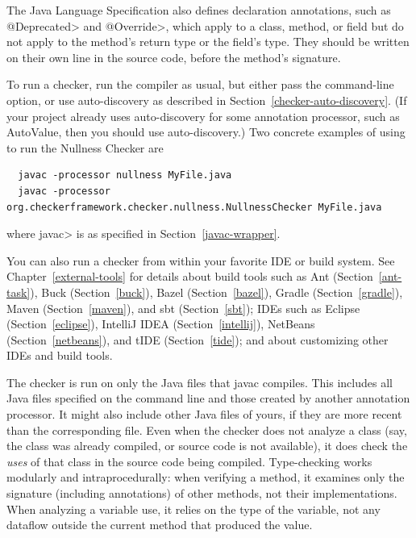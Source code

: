The Java Language Specification also defines
declaration annotations, such as \<@Deprecated> and \<@Override>, which apply
to a class, method, or field but do not apply to the method's return type
or the field's type.  They should be written on their own line in the
source code, before the method's signature.



To run a checker, run the compiler  as usual,
but either pass the  command-line
option, or use auto-discovery as described in
Section~\ref{checker-auto-discovery}.
(If your project already uses auto-discovery for some annotation processor,
such as AutoValue, then you should use auto-discovery.)
Two concrete examples of using  to run the Nullness Checker are

\begin{Verbatim}
  javac -processor nullness MyFile.java
  javac -processor org.checkerframework.checker.nullness.NullnessChecker MyFile.java
\end{Verbatim}

\noindent
where \<javac> is as specified in Section~\ref{javac-wrapper}.

You can also run a checker from within your favorite IDE or build system.  See
Chapter~\ref{external-tools} for details about build tools such as
Ant (Section~\ref{ant-task}),
Buck (Section~\ref{buck}),
Bazel (Section~\ref{bazel}),
Gradle (Section~\ref{gradle}),
Maven (Section~\ref{maven}), and
sbt (Section~\ref{sbt});
IDEs such as
Eclipse (Section~\ref{eclipse}),
IntelliJ IDEA (Section~\ref{intellij}),
NetBeans (Section~\ref{netbeans}),
and
tIDE (Section~\ref{tide});
and about customizing other IDEs and build tools.

The checker is run on only the Java files that javac compiles.
This includes all Java files specified on the command line and those
created by another annotation processor.  It might also include other Java
files of yours, if they are more recent than the corresponding  file.
Even when the checker does not analyze a class (say, the class was
already compiled, or source code is not available), it does check
the \emph{uses} of that class in the source code being compiled.
Type-checking works modularly and intraprocedurally:  when verifying a
method, it examines only the signature (including annotations) of other
methods, not their implementations.  When analyzing a variable use, it
relies on the type of the variable, not any dataflow outside the current
method that produced the value.


